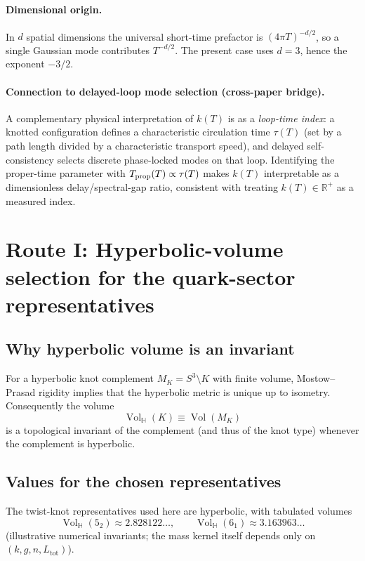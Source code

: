 \documentclass[11pt,a4paper]{article}
\newcommand{\Vol}{\operatorname{Vol}}
\begin{document}
        \paragraph{Dimensional origin.}
        In $d$ spatial dimensions the universal short-time prefactor is $(4\pi T)^{-d/2}$,
        so a single Gaussian mode contributes $T^{-d/2}$. The present case uses $d=3$,
        hence the exponent $-3/2$.

        \paragraph{Connection to delayed-loop mode selection (cross-paper bridge).}
        A complementary physical interpretation of $k(T)$ is as a \emph{loop-time index}:
        a knotted configuration defines a characteristic circulation time $\tau(T)$
        (set by a path length divided by a characteristic transport speed),
        and delayed self-consistency selects discrete phase-locked modes on that loop.
        Identifying the proper-time parameter with $T_{\rm prop}(T)\propto \tau(T)$
        makes $k(T)$ interpretable as a dimensionless delay/spectral-gap ratio,
        consistent with treating $k(T)\in\mathbb{R}^+$ as a measured index.

    \section{Route I: Hyperbolic-volume selection for the quark-sector representatives}

    \subsection{Why hyperbolic volume is an invariant}
    For a hyperbolic knot complement $M_K = S^3\setminus K$ with finite volume,
    Mostow--Prasad rigidity implies that the hyperbolic metric is unique up to isometry.
    Consequently the volume
    \[
        \Vol_{\mathbb H}(K)\equiv \Vol(M_K)
    \]
    is a topological invariant of the complement (and thus of the knot type) whenever
    the complement is hyperbolic.

    \subsection{Values for the chosen representatives}
    The twist-knot representatives used here are hyperbolic, with tabulated volumes
    \[
        \Vol_{\mathbb H}(5_2)\approx 2.828122\ldots,\qquad
        \Vol_{\mathbb H}(6_1)\approx 3.163963\ldots
    \]
    (illustrative numerical invariants; the mass kernel itself depends only on
    $(k,g,n,L_{\mathrm{tot}})$).
\end{document}
